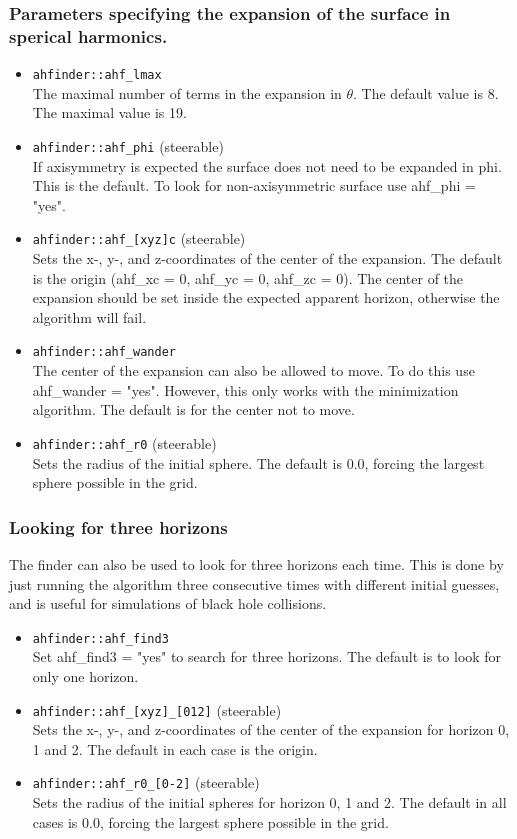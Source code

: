 \subsubsection*{Parameters specifying the expansion of the surface in sperical
                harmonics.}
\begin{itemize}
\item {\tt ahfinder::ahf\_lmax} \\
        The maximal number of terms in the expansion in $\theta$. The default
        value is 8. The maximal value is 19.
\item {\tt ahfinder::ahf\_phi} (steerable) \\
        If axisymmetry is expected the surface does not need to be
        expanded in phi. This is the default. To look for non-axisymmetric
        surface use ahf\_phi = "yes".
\item {\tt ahfinder::ahf\_[xyz]c} (steerable) \\
        Sets the x-, y-, and z-coordinates of the center of the expansion.
        The default is the origin (ahf\_xc = 0, ahf\_yc = 0, ahf\_zc = 0).
        The center of the expansion should be set inside the expected
        apparent horizon, otherwise the algorithm will fail.
\item {\tt ahfinder::ahf\_wander} \\
        The center of the expansion can also be allowed to move. To do this
        use ahf\_wander = "yes". However, this only works with the
        minimization algorithm. The default is for the center not to move.
\item {\tt ahfinder::ahf\_r0} (steerable) \\
        Sets the radius of the initial sphere. The default is 0.0, forcing
        the largest sphere possible in the grid.
\end{itemize}
\subsubsection*{Looking for three horizons}
The finder can also be used to look for three horizons each time.
This is done by just running the algorithm three consecutive times
with different initial guesses, and is useful for simulations of
black hole collisions.
\begin{itemize}
\item {\tt ahfinder::ahf\_find3} \\
        Set ahf\_find3 = "yes" to search for three horizons. The default is
        to look for only one horizon.
\item {\tt ahfinder::ahf\_[xyz]\_[012]} (steerable) \\
       Sets the x-, y-, and z-coordinates of the center of the expansion for
       horizon 0, 1 and 2. The default in each case is the origin.
\item {\tt ahfinder::ahf\_r0\_[0-2]} (steerable) \\
        Sets the radius of the initial spheres for horizon 0, 1 and 2.
        The default in all cases is 0.0, forcing the largest sphere possible
        in the grid.
\end{itemize}
